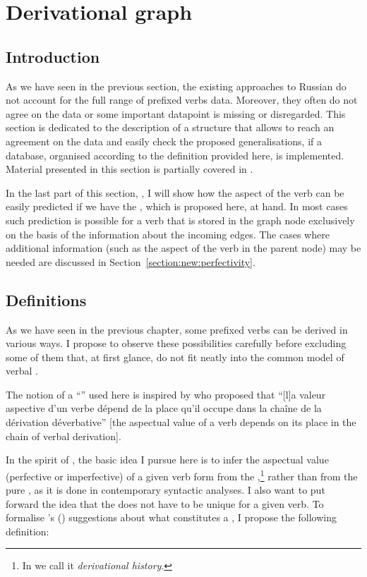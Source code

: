 
\section{Derivational graph}\label{section:graph}
\subsection{Introduction}
As we have seen in the previous section, the existing approaches to Russian  do not account for the full range of prefixed verbs data. Moreover, they often do not agree on the data or some important datapoint is missing or disregarded. This section is dedicated to the description of a structure that allows to reach an agreement on the  data and easily check the proposed generalisations, if a database, organised according to the definition provided here, is implemented. Material presented in this section is partially covered in \citet{ZinovaFilip:14b}.

In the last part of this section, , I will show how the aspect of the verb can be easily predicted if we have the , which is proposed here, at hand. In most cases such prediction is possible for a verb that is stored in the graph node exclusively on the basis of the information about the incoming edges. The cases where additional information (such as the aspect of the verb in the parent node) may be needed are discussed in Section~\ref{section:new:perfectivity}.

\subsection{Definitions}\label{section:chains:definition}
As we have seen in the previous chapter, some prefixed verbs can be derived in various ways. I propose to observe these possibilities carefully before excluding some of them that, at first glance, do not fit neatly into the common model of verbal .

The notion of a ``'' used here is inspired by \citet{Karcevski:27} who proposed that ``[l]a valeur aspective d'un verbe d\'{e}pend de la place qu'il occupe dans la cha\^{i}ne de la d\'{e}rivation d\'{e}verbative'' [the aspectual value of a verb depends on its place in the chain of verbal derivation].

In the spirit of \citet{Karcevski:27}, the basic idea I pursue here is to infer the aspectual value (perfective or imperfective) of a given verb form from the ,\footnote{In \citet{ZinovaFilip:14b} we call it \textit{derivational history}.} rather than from the pure , as it is done in contemporary syntactic analyses. I also want to put forward the idea that the  does not have to be unique for a given verb. To formalise \citeauthor{Karcevski:27}'s (\citeyear{Karcevski:27}) suggestions about what constitutes a , I propose the following definition:

